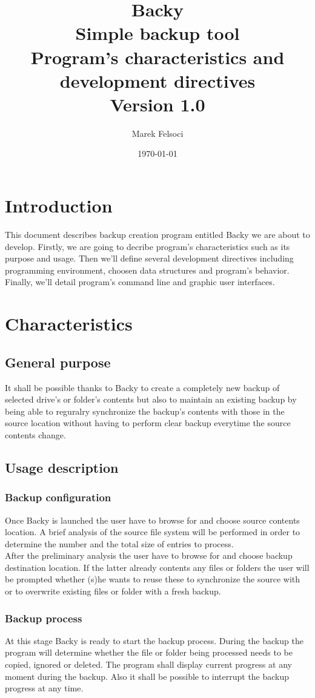 \documentclass[a4paper]{article}
\title{
  Backy \\
  \Large Simple backup tool \\
  \large Program's characteristics and development directives \\
  \normalsize Version 1.0 
}
\author{Marek Felsoci}
\date{\today}
\begin{document}
  \maketitle
  \tableofcontents
  \section{Introduction}
    This document describes backup creation program entitled Backy we are about to develop. Firstly, we are going to decribe program's characteristics such as its purpose and usage. Then we'll define several development directives including programming environment, choosen data structures and program's behavior. Finally, we'll detail program's command line and graphic user interfaces.
  \section{Characteristics}
    \subsection{General purpose}  
      It shall be possible thanks to Backy to create a completely new backup of selected drive's or folder's contents but also to maintain an existing backup by being able to reguralry synchronize the backup's contents with those in the source location without having to perform clear backup everytime the source contents change.
    \subsection{Usage description}
      \subsubsection{Backup configuration}
        Once Backy is launched the user have to browse for and choose source contents location. A brief analysis of the source file system will be performed in order to determine the number and the total size of entries to process. \\
        \indent After the preliminary analysis the user have to browse for and choose backup destination location. If the latter already contents any files or folders the user will be prompted whether (s)he wants to reuse these to synchronize the source with or to overwrite existing files or folder with a fresh backup. \\
      \subsubsection{Backup process}  
        At this stage Backy is ready to start the backup process. During the backup the program will determine whether the file or folder being processed needs to be copied, ignored or deleted. The program shall display current progress at any moment during the backup. Also it shall be possible to interrupt the backup progress at any time. \\
\end{document}
